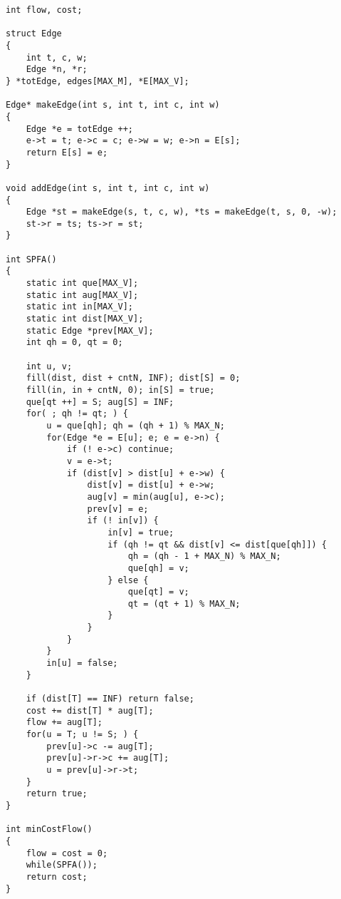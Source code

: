 \begin{lstlisting}
int flow, cost;

struct Edge
{
	int t, c, w;
	Edge *n, *r;
} *totEdge, edges[MAX_M], *E[MAX_V];

Edge* makeEdge(int s, int t, int c, int w)
{
	Edge *e = totEdge ++;
	e->t = t; e->c = c; e->w = w; e->n = E[s];
	return E[s] = e;
}

void addEdge(int s, int t, int c, int w)
{
	Edge *st = makeEdge(s, t, c, w), *ts = makeEdge(t, s, 0, -w);
	st->r = ts; ts->r = st;
}

int SPFA()
{
	static int que[MAX_V];
	static int aug[MAX_V];
	static int in[MAX_V];
	static int dist[MAX_V];
	static Edge *prev[MAX_V];
	int qh = 0, qt = 0;
	
	int u, v;
	fill(dist, dist + cntN, INF); dist[S] = 0;
	fill(in, in + cntN, 0); in[S] = true;
	que[qt ++] = S; aug[S] = INF;
	for( ; qh != qt; ) {
		u = que[qh]; qh = (qh + 1) % MAX_N;
		for(Edge *e = E[u]; e; e = e->n) {
			if (! e->c) continue;
			v = e->t;
			if (dist[v] > dist[u] + e->w) {
				dist[v] = dist[u] + e->w;
				aug[v] = min(aug[u], e->c);
				prev[v] = e;
				if (! in[v]) {
					in[v] = true;
					if (qh != qt && dist[v] <= dist[que[qh]]) {
						qh = (qh - 1 + MAX_N) % MAX_N;
						que[qh] = v;
					} else {
						que[qt] = v;
						qt = (qt + 1) % MAX_N;
					}
				}
			}
		}
		in[u] = false;
	}
	
	if (dist[T] == INF) return false;
	cost += dist[T] * aug[T];
	flow += aug[T];
	for(u = T; u != S; ) {
		prev[u]->c -= aug[T];
		prev[u]->r->c += aug[T];
		u = prev[u]->r->t;
	}
	return true;
}

int minCostFlow()
{
	flow = cost = 0;
	while(SPFA());
	return cost;
}
\end{lstlisting}
